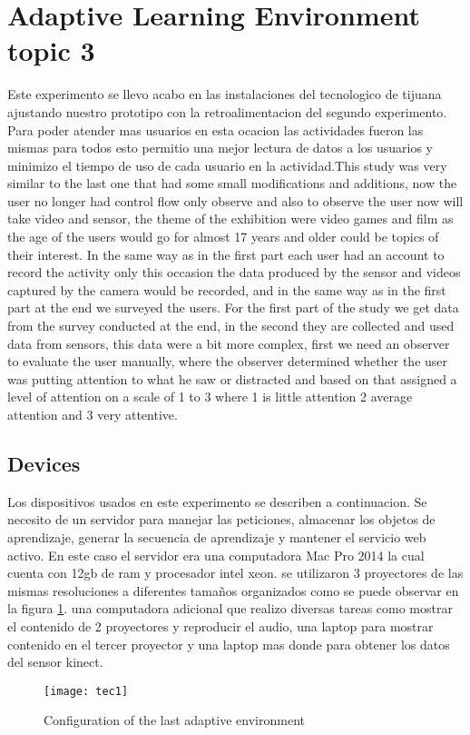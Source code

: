 \section{Adaptive Learning Environment topic 3}
Este experimento se llevo acabo en las instalaciones del tecnologico de tijuana ajustando nuestro prototipo con la retroalimentacion del segundo experimento. Para poder atender mas usuarios en esta ocacion las actividades fueron las mismas para todos esto permitio una mejor lectura de datos a los usuarios y minimizo el tiempo de uso de cada usuario en la actividad.This study was very similar to the last one that had some small modiﬁcations and additions, now the user no longer had control ﬂow only observe and also to observe the user now will take video and sensor, the theme of the exhibition were video games and ﬁlm as the age of the users would go for almost 17 years and older could be topics of their interest. In the same way as in the ﬁrst part each user had an account to record the activity only this occasion the data produced by the sensor and videos captured by the camera would be recorded, and in the same way as in the ﬁrst part at the end we surveyed the users.
For the ﬁrst part of the study we get data from the survey conducted at the end, in the second they are collected and used data from sensors, this data were a bit more complex, ﬁrst we need an observer to evaluate the user manually, where the observer determined whether the user was putting attention to what he saw or distracted and based on that assigned a level of attention on a scale of 1 to 3 where 1 is little attention 2 average attention and 3 very attentive. 
\subsection{Devices}
Los dispositivos usados en este experimento se describen a continuacion. Se necesito de un servidor para manejar las peticiones, almacenar los objetos de aprendizaje, generar la secuencia de aprendizaje y mantener el servicio web activo. En este caso el servidor era una computadora Mac Pro 2014 la cual cuenta con 12gb de ram y procesador intel xeon. se utilizaron 3 proyectores de las mismas resoluciones a diferentes tamaños organizados como se puede observar en la figura \ref{ambiente4}. una computadora adicional que realizo diversas tareas como mostrar el contenido de 2 proyectores y reproducir el audio,  una laptop para mostrar contenido en el tercer proyector y una laptop mas donde para obtener los datos del sensor kinect.
\begin{figure}[ht!]  
\centering  
\texttt{[image: tec1]}
\quad  
\caption{Configuration of the last adaptive environment}  
\label{ambiente4}  
\end{figure}


